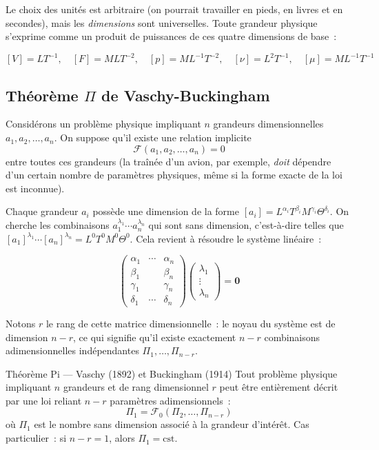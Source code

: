 \documentclass[11pt,a4paper]{report}
\begin{document}
\noindent Le choix des unités est arbitraire (on pourrait travailler en pieds,
en livres et en secondes), mais les \emph{dimensions} sont universelles.
Toute grandeur physique s'exprime comme un produit de puissances de ces quatre
dimensions de base~:

\[
[V] = LT^{-1}, \quad
[F] = MLT^{-2}, \quad
[p] = ML^{-1}T^{-2}, \quad
[\nu] = L^2T^{-1}, \quad
[\mu] = ML^{-1}T^{-1}
\]

\subsection{Théorème $\Pi$ de Vaschy-Buckingham}

Considérons un problème physique impliquant $n$ grandeurs dimensionnelles
$a_1, a_2, \ldots, a_n$. On suppose qu'il existe une relation implicite
\[
    \mathcal{F}(a_1, a_2, \ldots, a_n) = 0
\]
entre toutes ces grandeurs (la traînée d'un avion, par exemple, \emph{doit}
dépendre d'un certain nombre de paramètres physiques, même si la forme exacte
de la loi est inconnue).

Chaque grandeur $a_i$ possède une dimension de la forme
$[a_i] = L^{\alpha_i}T^{\beta_i}M^{\gamma_i}\Theta^{\delta_i}$.
On cherche les combinaisons $a_1^{\lambda_1}\cdots a_n^{\lambda_n}$
qui sont sans dimension, c'est-à-dire telles que
$[a_1]^{\lambda_1}\cdots[a_n]^{\lambda_n} = L^0T^0M^0\Theta^0$.
Cela revient à résoudre le système linéaire~:

\[
\begin{pmatrix} \alpha_1 & \cdots & \alpha_n \\ \beta_1 & & \beta_n \\ \gamma_1 & & \gamma_n \\ \delta_1 & \cdots & \delta_n \end{pmatrix}
\begin{pmatrix} \lambda_1 \\ \vdots \\ \lambda_n \end{pmatrix} = \mathbf{0}
\]

Notons $r$ le rang de cette matrice dimensionnelle~: le noyau du système est
de dimension $n-r$, ce qui signifie qu'il existe exactement $n-r$ combinaisons
adimensionnelles indépendantes $\Pi_1, \ldots, \Pi_{n-r}$.

\begin{importantbox}{Théorème Pi --- Vaschy (1892) et Buckingham (1914)}
Tout problème physique impliquant $n$ grandeurs et de rang dimensionnel $r$
peut être entièrement décrit par une loi reliant $n-r$ paramètres
adimensionnels~:
\[
    \Pi_1 = \mathcal{F}_0(\Pi_2, \ldots, \Pi_{n-r})
\]
où $\Pi_1$ est le nombre sans dimension associé à la grandeur d'intérêt.
Cas particulier~: si $n - r = 1$, alors $\Pi_1 = \mathrm{cst}$.
\end{importantbox}
\end{document}
